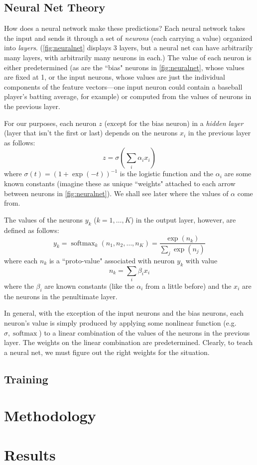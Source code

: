 \documentclass{article}
\DeclareMathOperator{\softmax}{softmax}
\begin{document}
\subsection{Neural Net Theory}

How does a neural network make these predictions?
Each neural network takes the input and sends it through a set of \emph{neurons} (each carrying a value) organized into \emph{layers}.
(\cref{fig:neuralnet} displays 3 layers, but a neural net can have arbitrarily many layers, with arbitrarily many neurons in each.)
The value of each neuron is either predetermined (as are the ``bias" neurons in \cref{fig:neuralnet}, whose values are fixed at 1, or the input neurons, whose values are just the individual components of the feature vectors---one input neuron could contain a baseball player's batting average, for example) or computed from the values of neurons in the previous layer.

For our purposes, each neuron $z$ (except for the bias neuron) in a \emph{hidden layer} (layer that isn't the first or last) depends on the neurons $x_i$ in the previous layer as follows:
\[ z = \sigma\left(\sum_i \alpha_i x_i \right) \]
where $\sigma(t) = (1 + \exp(-t))^{-1}$ is the logistic function and the $\alpha_i$ are some known constants (imagine these as unique ``weights" attached to each arrow between neurons in \cref{fig:neuralnet}). We shall see later where the values of $\alpha$ come from.

The values of the neurons $y_k$ ($k = 1, \dots, K$) in the output layer, however, are defined as follows:
\[ y_k = \softmax_k(n_1, n_2, \dots, n_K) = \frac{\exp(n_k)}{\sum_j \exp(n_j)} \]
where each $n_k$ is a ``proto-value" associated with neuron $y_k$ with value
\[ n_k = \sum_i \beta_i x_i \]
where the $\beta_i$ are known constants (like the $\alpha_i$ from a little before) and the $x_i$ are the neurons in the penultimate layer.

In general, with the exception of the input neurons and the bias neurons, each neuron's value is simply produced by applying some nonlinear function (e.g. $\sigma, \softmax$) to a linear combination of the values of the neurons in the previous layer. The weights on the linear combination are predetermined. Clearly, to teach a neural net, we must figure out the right weights for the situation.

\subsection{Training}




\section{Methodology}


\section{Results}

\end{document}
